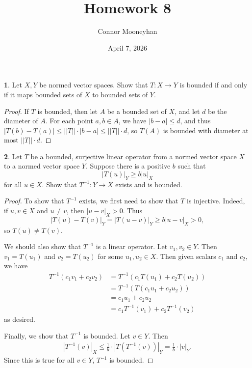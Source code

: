 \documentclass[12pt]{article}
\title{Homework 8}
\author{Connor Mooneyhan}
\date{April 7, 2026}
\theoremstyle{definition}
\newtheorem{ex}{}
\begin{document}
\maketitle

\begin{ex}
	Let $X, Y$ be normed vector spaces.
	Show that $T: X \to Y$ is bounded if and only if it maps bounded sets of $X$ to bounded sets of $Y$.
\end{ex}
\begin{proof}
	If $T$ is bounded, then let $A$ be a bounded set of $X$, and let $d$ be the diameter of $A$.
	For each point $a, b \in A$, we have $|b - a| \leq d$, and thus $|T(b) - T(a)| \leq ||T|| \cdot |b - a| \leq ||T|| \cdot d$, so $T(A)$ is bounded with diameter at most $||T|| \cdot d$.
\end{proof}

\begin{ex}
	Let $T$ be a bounded, surjective linear operator from a normed vector space $X$ to a normed vector space $Y$.
	Suppose there is a positive $b$ such that \begin{equation*}
		|T(u)|_Y \geq b|u|_X
	\end{equation*}
	for all $u \in X$.
	Show that $T^{-1} : Y \to X$ exists and is bounded.
\end{ex}
\begin{proof}
	To show that $T^{-1}$ exists, we first need to show that $T$ is injective.
	Indeed, if $u, v \in X$ and $u \neq v$, then $|u - v|_X > 0$.
	Thus \begin{equation*}
		|T(u) - T(v)|_Y = |T(u - v)|_Y \geq b|u - v|_X > 0,
	\end{equation*}
	so $T(u) \neq T(v)$.

	We should also show that $T^{-1}$ is a linear operator.
	Let $v_1, v_2 \in Y$.
	Then $v_1 = T(u_1)$ and $v_2 = T(u_2)$ for some $u_1, u_2 \in X$.
	Then given scalars $c_1$ and $c_2$, we have \begin{align*}
		T^{-1}(c_1v_1 + c_2v_2) & = T^{-1}(c_1T(u_1) + c_2T(u_2))   \\
		                        & = T^{-1}(T(c_1u_1 + c_2u_2))      \\
		                        & = c_1u_1 + c_2u_2                 \\
		                        & = c_1T^{-1}(v_1) + c_2T^{-1}(v_2)
	\end{align*}
	as desired.

	Finally, we show that $T^{-1}$ is bounded.
	Let $v \in Y$.
	Then \begin{align*}
		|T^{-1}(v)|_X \leq \frac{1}{b} \cdot \left|T(T^{-1}(v))\right|_Y = \frac{1}{b} \cdot \left|v\right|_Y.
	\end{align*}
	Since this is true for all $v \in Y$, $T^{-1}$ is bounded.
\end{proof}
\end{document}
